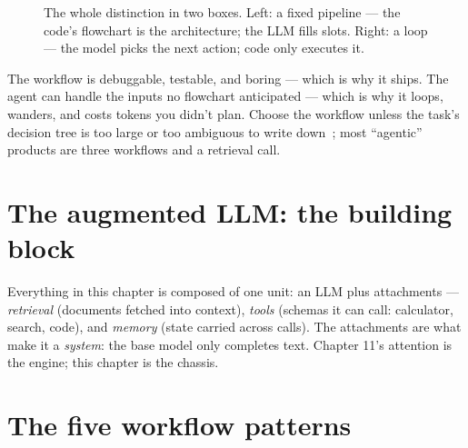 \begin{figure}[htbp]
\centering
{}
\caption{The whole distinction in two boxes. Left: a fixed pipeline
--- the code's flowchart is the architecture; the LLM fills slots.
Right: a loop --- the model picks the next action; code only
executes it.}
\label{fig:wva}
\end{figure}

The workflow is debuggable, testable, and boring --- which is why it
ships. The agent can handle the inputs no flowchart anticipated ---
which is why it loops, wanders, and costs tokens you didn't plan.
Choose the workflow unless the task's decision tree is too large or
too ambiguous to write down~\cite{anthropic_agents}; most
``agentic'' products are three workflows and a retrieval call.

\section{The augmented LLM: the building block}
\label{sec:aug}

Everything in this chapter is composed of one unit: an LLM plus
attachments --- \emph{retrieval} (documents fetched into context),
\emph{tools} (schemas it can call: calculator, search, code),
and \emph{memory} (state carried across calls). The attachments are
what make it a \emph{system}: the base model only completes text.
Chapter 11's attention is the engine; this chapter is the chassis.

\section{The five workflow patterns}
\label{sec:patterns}

